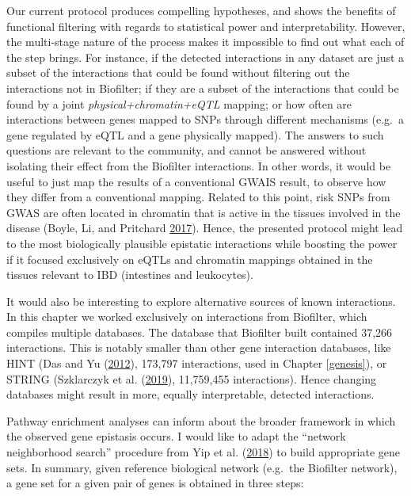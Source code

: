 \documentclass[
  11pt,
]{env/yjiao}
\begin{document}
Our current protocol produces compelling hypotheses,
and shows the benefits of functional filtering with regards to statistical power and
interpretability. However, the multi-stage nature of the process makes it
impossible to find out what each of the step brings. For instance, if the
detected interactions in any dataset are just a subset of the interactions that could be
found without filtering out the interactions not in Biofilter; if they are
a subset of the interactions that could be found by a joint \emph{physical+chromatin+eQTL}
mapping; or how often are interactions between genes mapped to SNPs through
different mechanisms (e.g.~a gene regulated by eQTL and a gene physically mapped).
The answers to such questions are relevant to the community,
and cannot be answered without isolating their effect from the Biofilter
interactions. In other words, it would be useful to just map the results of a
conventional GWAIS result, to observe how they differ from a conventional
mapping. Related to this point, risk SNPs from GWAS are often located
in chromatin that is active in the tissues involved in the disease
(Boyle, Li, and Pritchard \protect\hyperlink{ref-boyle_expanded_2017}{2017}). Hence, the presented protocol might lead to the most biologically
plausible epistatic interactions while boosting the power if it focused exclusively
on eQTLs and chromatin mappings obtained in the tissues relevant
to IBD (intestines and leukocytes).

It would also be interesting to explore alternative sources of known
interactions. In this chapter we worked
exclusively on interactions from Biofilter, which compiles multiple databases.
The database that Biofilter built contained 37,266 interactions. This
is notably smaller than other gene interaction databases, like HINT
(Das and Yu (\protect\hyperlink{ref-das_hint_2012}{2012}), 173,797 interactions, used in Chapter \ref{genesis}), or
STRING (Szklarczyk et al. (\protect\hyperlink{ref-szklarczyk_string_2019}{2019}), 11,759,455 interactions). Hence changing
databases might result in more, equally interpretable, detected interactions.

Pathway enrichment analyses can inform about the broader framework
in which the observed gene epistasis occurs. I would like to adapt the ``network neighborhood
search'' procedure from Yip et al. (\protect\hyperlink{ref-yip2018network}{2018}) to build appropriate gene sets. In
summary, given reference biological network (e.g.~the Biofilter network), a
gene set for a given pair of genes is obtained in three steps:
\end{document}

